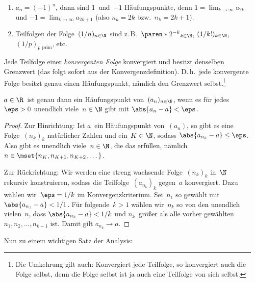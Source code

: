\documentclass[a4paper]{article}
\begin{document}
\begin{example}\leavevmode
    \begin{enumerate}
        \item $a_n = (-1)^n$, dann sind 1~und~$-1$ Häufungspunkte, denn $1 = \lim_{k\to\infty} a_{2k}$ und $-1 = \lim_{k\to\infty} a_{2k+1}$ (also $n_k = 2k$ bzw.\ $n_k = 2k+1$).
        \item Teilfolgen der Folge~$(1/n)_{n\in\N}$ sind z.\,B.\ $\paren*{2^{-k}}_{k\in\N}$, $(1/k!)_{k\in\N}$, $(1/p)_{p\text{ prim}}$, etc.
    \end{enumerate}
\end{example}

\begin{remark}\label{rem:subsequence:convergence}
    Jede Teilfolge einer \emph{konvergenten Folge} konvergiert und besitzt denselben Grenzwert (das folgt sofort aus der Konvergenzdefinition). D.\,h.\ jede konvergente Folge besitzt genau einen Häufungspunkt, nämlich den Grenzwert selbst.\footnote{Die Umkehrung gilt auch: Konvergiert jede Teilfolge, so konvergiert auch die Folge selbst, denn die Folge selbst ist ja auch eine Teilfolge von sich selbst.}
\end{remark}

\begin{lemma}
    $a \in \R$~ist genau dann ein Häufungspunkt von~$(a_n)_{n\in\N}$, wenn es für jedes~$\eps > 0$ unendlich viele~$n \in \N$ gibt mit $\abs{a_n-a} < \eps$.
\end{lemma}

\begin{proof}
    Zur Hinrichtung: Ist $a$~ein Häufungspunkt von~$(a_n)$, so gibt es eine Folge~$(n_k)_k$ natürlicher Zahlen und ein~$K \in \N$, sodass $\abs{a_{n_k}-a} \leq \eps$. Also gibt es unendlich viele~$n \in \N$, die das erfüllen, nämlich $n \in \mset{n_K, n_{K+1}, n_{K+2}, \dots}$.

    Zur Rückrichtung: Wir werden eine streng wachsende Folge~$(n_k)_k$ in~$\N$ rekursiv konstruieren, sodass die Teilfolge~$(a_{n_k})_k$ gegen~$a$ konvergiert. Dazu wählen wir~$\eps = 1/k$ im Konvergenzkriterium. Sei~$n_1$ so gewählt mit $\abs{a_{n_1}-a} < 1/1$. Für folgende~$k > 1$ wählen wir~$n_k$ so von den unendlich vielen~$n$, dass $\abs{a_{n_k}-a} < 1/k$ und $n_k$~größer als alle vorher gewählten $n_1, n_2, \dots, n_{k-1}$ ist. Damit gilt $a_{n_k} \to a$.
\end{proof}

Nun zu einem wichtigen Satz der Analysis:
\end{document}
